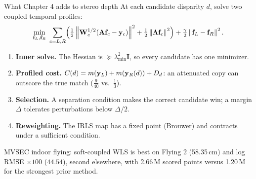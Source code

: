 \begin{frame}{What Chapter 4 adds to stereo depth}
\footnotesize
At each candidate disparity $d$, solve two coupled temporal profiles:
\[\min_{\fL,\fR}\ \sum_{c=L,R}\Bigl(\tfrac12\norm{\W_c^{1/2}(\A\mathbf f_c-\mathbf y_c)}^2+\tfrac12\norm{\Lam\mathbf f_c}^2\Bigr)+\tfrac\gamma2\norm{\fL-\fR}^2.\]
\vspace{-3mm}
\begin{enumerate}\setlength{\itemsep}{0pt}
\item \textbf{Inner solve.} The Hessian is $\succeq\lambda_{\min}^2\mathbf I$, so every candidate has one minimizer.
\item \textbf{Profiled cost.} $C(d)=m(\mathbf y_L)+m(\mathbf y_R(d))+D_d$: an attenuated copy can outscore the true match ($\tfrac9{40}$ vs.\ $\tfrac13$).
\item \textbf{Selection.} A separation condition makes the correct candidate win; a margin $\Delta$ tolerates perturbations below $\Delta/2$.
\item \textbf{Reweighting.} The IRLS map has a fixed point (Brouwer) and contracts under a sufficient condition.
\end{enumerate}
MVSEC indoor flying: soft-coupled WLS is best on Flying 2 (58.35\,cm) and log RMSE $\times100$ ($44.54$), second elsewhere, with 2.66\,M scored points versus 1.20\,M for the strongest prior method.

\end{frame}
